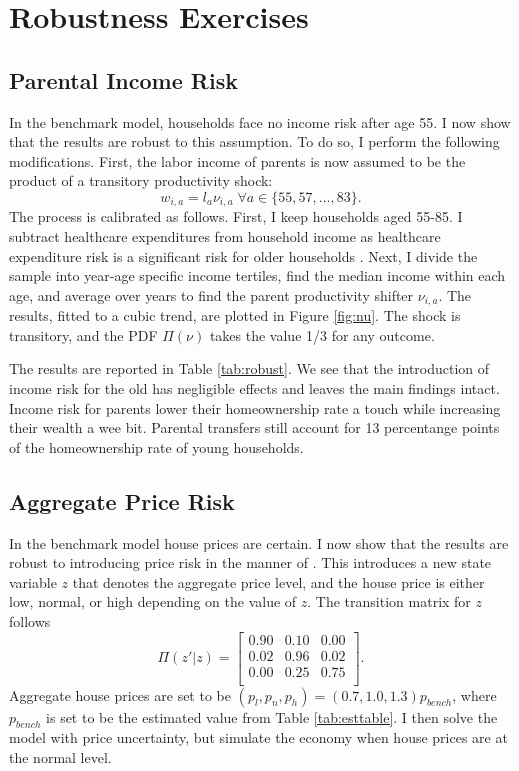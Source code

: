 \documentclass[12pt]{article}
\begin{document}
\section{Robustness Exercises}
\subsection{Parental Income Risk}\label{sec:robust_incomerisk}
In the benchmark model, households face no income risk after age 55. I now show that the results are robust to this assumption. To do so, I perform the following modifications. First, the labor income of parents is now assumed to be the product of a transitory productivity shock:
\begin{equation*}
w_{i,a} = l_a \nu_{i,a} \; \forall a\in\{55,57,\dots,83\}. \label{eq:wp2}
\end{equation*}
The process is calibrated as follows. First, I keep households aged 55-85. I subtract healthcare expenditures from household income as healthcare expenditure risk is a significant risk for older households \citep{denardi2024}. Next, I divide the sample into year-age specific income tertiles, find the median income within each age, and average over years to find the parent productivity shifter $\nu_{i,a}$. The results, fitted to a cubic trend, are plotted in Figure \ref{fig:nu}. The shock is transitory, and the PDF $\Pi(\nu)$ takes the value 1/3 for any outcome.

The results are reported in Table \ref{tab:robust}. We see that the introduction of income risk for the old has negligible effects and leaves the main findings intact. Income risk for parents lower their homeownership rate a touch while increasing their wealth a wee bit. Parental transfers still account for 13 percentange points of the homeownership rate of young households.

\subsection{Aggregate Price Risk}\label{sec:robust_pricerisk}
In the benchmark model house prices are certain. I now show that the results are robust to introducing price risk in the manner of \cite{Corbae2015}. This introduces a new state variable $z$ that denotes the aggregate price level, and the house price is either low, normal, or high depending on the value of $z$. The transition matrix for $z$ follows 
\begin{equation}
\Pi(z'|z) = \begin{bmatrix}
0.90 & 0.10 & 0.00 \\
0.02 & 0.96 & 0.02 \\
0.00 & 0.25 & 0.75 \\
\end{bmatrix}.
\end{equation}
Aggregate house prices are set to be $(p_l,p_n,p_h)=(0.7,1.0,1.3)p_{bench}$, where $p_{bench}$ is set to be the estimated value from Table \ref{tab:esttable}. I then solve the model with price uncertainty, but simulate the economy when house prices are at the normal level. 
\end{document}
